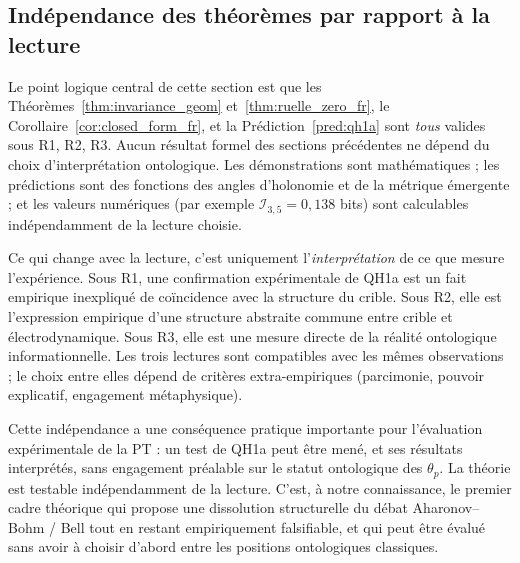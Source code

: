 \subsection{Indépendance des théorèmes par rapport à la lecture}
\label{ssec:independance}

Le point logique central de cette section est que les
Théorèmes~\ref{thm:invariance_geom}
et~\ref{thm:ruelle_zero_fr}, le
Corollaire~\ref{cor:closed_form_fr}, et la
Prédiction~\ref{pred:qh1a} sont \emph{tous} valides sous R1, R2,
R3. Aucun résultat formel des sections
précédentes ne dépend du choix d'interprétation ontologique. Les
démonstrations sont mathématiques ; les prédictions sont des
fonctions des angles d'holonomie et de la métrique émergente ; et
les valeurs numériques (par exemple
$\mathcal{I}_{3,5} = 0{,}138$ bits) sont calculables
indépendamment de la lecture choisie.

Ce qui change avec la lecture, c'est uniquement
l'\emph{interprétation} de ce que mesure l'expérience. Sous R1,
une confirmation expérimentale de QH1a est un fait empirique
inexpliqué de coïncidence avec la structure du crible. Sous R2,
elle est l'expression empirique d'une structure abstraite
commune entre crible et électrodynamique. Sous R3, elle est une
mesure directe de la réalité ontologique informationnelle. Les
trois lectures sont compatibles avec les mêmes observations ; le
choix entre elles dépend de critères extra-empiriques (parcimonie,
pouvoir explicatif, engagement métaphysique).

Cette indépendance a une conséquence pratique importante pour
l'évaluation expérimentale de la PT : un test de QH1a peut être
mené, et ses résultats interprétés, sans engagement préalable sur
le statut ontologique des $\theta_p$. La théorie est testable
indépendamment de la lecture. C'est, à notre connaissance, le
premier cadre théorique qui propose une dissolution structurelle
du débat Aharonov--Bohm / Bell tout en restant
empiriquement falsifiable, et qui peut être évalué sans avoir à
choisir d'abord entre les positions ontologiques classiques.
